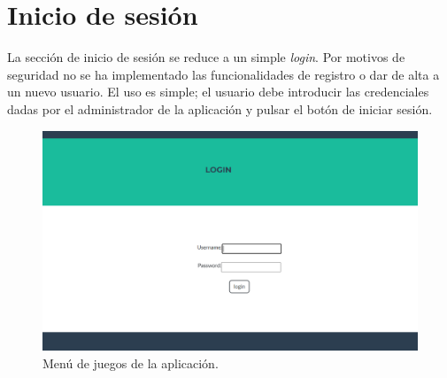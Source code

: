 \documentclass[a4paper, 12pt]{book}
\begin{document}
\section{Inicio de sesión}
La sección de inicio de sesión se reduce a un simple \emph{login}. Por motivos de seguridad no se ha implementado las funcionalidades de registro o dar de alta a un nuevo usuario. El uso es simple; el usuario debe introducir las credenciales dadas por el administrador de la aplicación y pulsar el botón de iniciar sesión. 
\begin{figure}
	\centering
	\includegraphics[width=16cm, keepaspectratio]{img/login_html.png}
	\caption{Menú de juegos de la aplicación.}\label{fig:login}
\end{figure}
\end{document}
